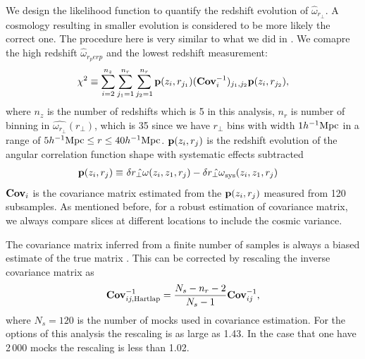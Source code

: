 \documentclass[iop]{emulateapj}
\begin{document}
We design the likelihood function to quantify
the redshift evolution of $\hat\omega_{r_\perp}$.
A cosmology resulting in smaller evolution is considered to be more likely the correct one.
The procedure here is very similar to what we did in \cite{Li2014,Li2015,Li2016}.
We comapre the high redshift $\hat\omega_{r_perp}$ and the lowest redshift measurement:
\begin{equation}\label{eq:chisq1}
\chi^2\equiv \sum_{i=2}^{n_{z}} \sum_{j_1=1}^{n_{r}} \sum_{j_2=1}^{n_{r}} {\bf p}(z_i,r_{j_1}) ({\bf Cov}_{i}^{-1})_{j_1,j_2}  {\bf p}(z_i,r_{j_2}),
\end{equation}
where $n_z$ is the number of redshifts which is 5 in this analysis, 
$n_r$ is number of binning in $\hat{\omega_{r_\perp}}(r_\perp)$,
which is 35 since we have $r_\perp$ bins 
with width $1h^{-1}\rm Mpc$ in a range of $5h^{-1}{\rm Mpc}\leq r\leq 40h^{-1}{\rm Mpc}$.
${\bf p}(z_i,r_{j})$ is the redshift evolution of the angular correlation function shape with systematic effects subtracted
\begin{eqnarray}\label{eq:bfp}
 {\bf p}(z_i,r_{j}) \equiv&\ \delta \hat{r_\perp\omega}(z_i,z_1,r_j) - \delta \hat{r_\perp\omega}_{\rm sys}(z_i,z_1,r_j)
\end{eqnarray}
${\bf Cov}_i$ is the covariance matrix estimated from the ${\bf p}(z_i,r_{j})$ measured from 120 subsamples.
As mentioned before, for a robust estimation of covariance matrix, 
we always compare slices at different locations to 
include the cosmic variance.

The covariance matrix inferred from a finite number of samples
is always a biased estimate of the true matrix \citep{Hartlap}.
This can be corrected by rescaling the inverse covariance matrix as 
\begin{equation}
 {\bf Cov}^{-1}_{ij,\rm Hartlap} = \frac{N_s - n_{r}-2}{N_s-1} {\bf Cov}^{-1}_{ij},
\end{equation}
where $N_s=120$ is the number of mocks used in covariance estimation.
For the options of this analysis the rescaling is as large as 1.43.
In the case that one have 2\,000 mocks the rescaling is less than 1.02.
\end{document}

